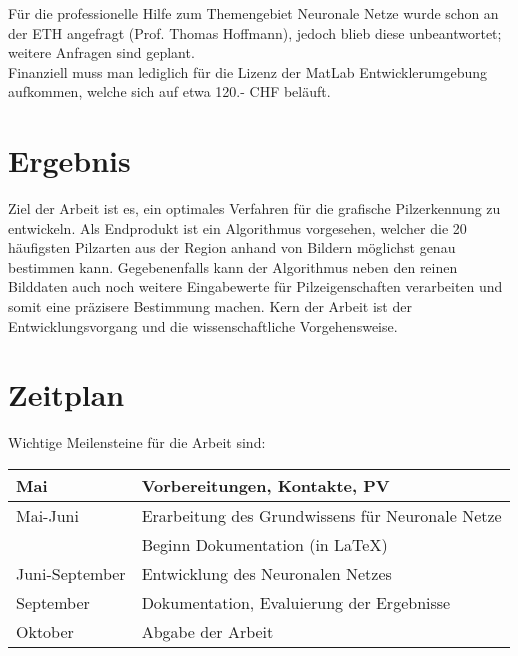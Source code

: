 \noindent Für die professionelle Hilfe zum Themengebiet Neuronale Netze wurde schon an der ETH angefragt (Prof. Thomas Hoffmann), jedoch blieb diese unbeantwortet; weitere Anfragen sind geplant.\\

\noindent Finanziell muss man lediglich für die Lizenz der MatLab Entwicklerumgebung aufkommen, welche sich auf etwa 120.- CHF beläuft.


\section{Ergebnis}
Ziel der Arbeit ist es, ein optimales Verfahren für die grafische Pilzerkennung zu entwickeln. Als Endprodukt ist ein Algorithmus vorgesehen, welcher die 20 häufigsten Pilzarten aus der Region anhand von Bildern möglichst genau bestimmen kann. Gegebenenfalls kann der Algorithmus neben den reinen Bilddaten auch noch weitere Eingabewerte für Pilzeigenschaften verarbeiten und somit eine präzisere Bestimmung machen. Kern der Arbeit ist der Entwicklungsvorgang und die wissenschaftliche Vorgehensweise.

\section{Zeitplan}
Wichtige Meilensteine für die Arbeit sind:\\

\begin{center}
\begin{tabular}{ l l }
\hline
Mai & Vorbereitungen, Kontakte, PV\\
\hline
Mai-Juni & Erarbeitung des Grundwissens für Neuronale Netze\\
& Beginn Dokumentation (in \LaTeX)\\
\hline
Juni-September & Entwicklung des Neuronalen Netzes\\
\hline
September & Dokumentation, Evaluierung der Ergebnisse\\
\hline
Oktober & Abgabe der Arbeit\\
\hline
\end{tabular}
\end{center} 
\vspace{1cm}

